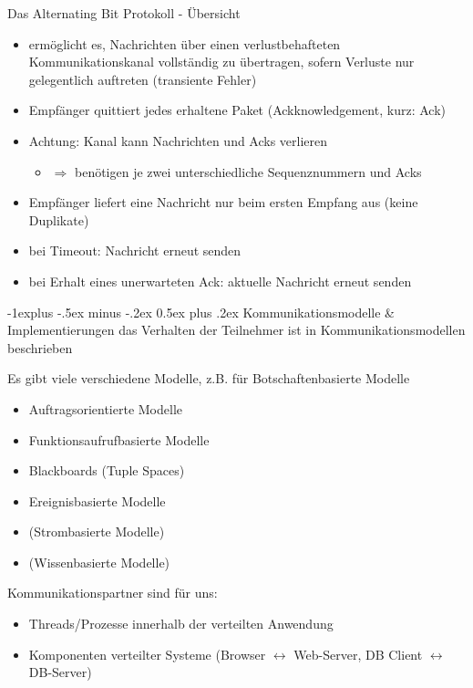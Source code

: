 \documentclass[10pt]{article}
\makeatletter
\renewcommand{\subsection}{\@startsection{subsection}{2}{0mm}%
                                {-1explus -.5ex minus -.2ex}%
                                {0.5ex plus .2ex}%
                                {\normalfont\normalsize\bfseries}}
\makeatother
\begin{document}
Das Alternating Bit Protokoll - Übersicht
\begin{itemize}
  \item ermöglicht es, Nachrichten über einen verlustbehafteten Kommunikationskanal vollständig zu übertragen, sofern Verluste nur gelegentlich auftreten (transiente Fehler)
  \item Empfänger quittiert jedes erhaltene Paket (Ackknowledgement, kurz: Ack)
  \item Achtung: Kanal kann Nachrichten und Acks verlieren
        \begin{itemize}
          \item $\Rightarrow$ benötigen je zwei unterschiedliche Sequenznummern und Acks
        \end{itemize}
  \item Empfänger liefert eine Nachricht nur beim ersten Empfang aus (keine Duplikate)
  \item bei Timeout: Nachricht erneut senden
  \item bei Erhalt eines unerwarteten Ack: aktuelle Nachricht erneut senden
\end{itemize}

\subsection{Kommunikationsmodelle \& Implementierungen}
das Verhalten der Teilnehmer ist in Kommunikationsmodellen beschrieben

Es gibt viele verschiedene Modelle, z.B. für Botschaftenbasierte Modelle
\begin{itemize}
  \item Auftragsorientierte Modelle
  \item Funktionsaufrufbasierte Modelle
  \item Blackboards (Tuple Spaces)
  \item Ereignisbasierte Modelle
  \item (Strombasierte Modelle)
  \item (Wissenbasierte Modelle)
\end{itemize}

Kommunikationspartner sind für uns:
\begin{itemize}
  \item Threads/Prozesse innerhalb der verteilten Anwendung
  \item Komponenten verteilter Systeme (Browser $\leftrightarrow$ Web-Server, DB Client $\leftrightarrow$ DB-Server)
\end{itemize}
\end{document}
